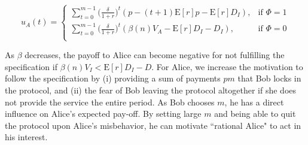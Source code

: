 \documentclass[runningheads]{llncs}
\begin{document}
\begin{equation}
\label{eq:beta_alice}
u_A(t) = 
\begin{cases}
    \sum_{t=0}^{m-1} \big( \frac{\delta}{1+r} \big)^{t} ( p - (t+1)\mathrm{E}[r]p -\mathrm{E}[r]D_{I}), & \text{if $\Phi=1$} \\
    \sum_{t=0}^{m-1} \big( \frac{\delta}{1+r} \big)^{t} (\beta(n) V_A - \mathrm{E}[r]D_{I}-D_{I}), & \text{if $\Phi=0$} \\
\end{cases}
\end{equation}



As $\beta$ decreases, the payoff to Alice can become negative for not fulfilling the specification if $\beta(n) V_I < \mathrm{E}[r]D_I - D$.
For Alice, we increase the motivation to follow the specification by (i) providing a sum of payments $pm$ that Bob locks in the protocol, and (ii) the fear of Bob leaving the protocol altogether if she does not provide the service the entire period. %
As Bob chooses $m$, he has a direct influence on Alice's expected pay-off.
By setting large $m$ and being able to quit the protocol upon Alice's misbehavior, he can motivate ``rational Alice" to act in his interest.
\end{document}

